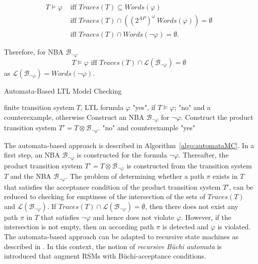 \documentclass[a4paper, 12pt, twoside]{report}
\begin{document}
	\begin{align*}
		T \models \varphi & \text{ iff } Traces(T) \subseteq Words(\varphi)\\
		& \text{ iff } Traces(T) \cap ((2^{AP})^{\omega} \ Words(\varphi)) = \emptyset\\
		& \text{ iff } Traces(T) \cap Words(\neg \varphi) = \emptyset.	
	\end{align*}
	
	Therefore, for NBA $\mathcal{B}_{\neg \varphi}$
	\[T \models \varphi \text{ iff } Traces(T) \cap \mathcal{L}(\mathcal{B}_{\neg \varphi}) = \emptyset\] as $\mathcal{L}(\mathcal{B}_{\neg \varphi}) = Words(\neg \varphi)$.

	\begin{algorithm}
		\caption{Automata-Based LTL Model Checking}\label{algo:automataMC}
		\begin{algorithmic} 
			\REQUIRE finite transition system $T$, LTL formula $\varphi$
			\ENSURE "yes", if $T \models \varphi$; "no" and a counterexample, otherwise 
			\STATE Construct an NBA $\mathcal{B}_{\neg \varphi}$ for $\neg \varphi$.
			\STATE Construct the product transition system $T'=T \otimes \mathcal{B}_{\neg \varphi}$.
			\RETURN "no" and counterexample
			\ELSE
			\RETURN "yes"
			\ENDIF
		\end{algorithmic}
	\end{algorithm}

	The automata-based approach is described in Algorithm~\ref{algo:automataMC}. In a first step, an NBA $\mathcal{B}_{\neg \varphi}$ is constructed for the formula $\neg \varphi$. Thereafter, the product transition system $T'=T \otimes \mathcal{B}_{\neg \varphi}$ is constructed from the transition system $T$ and the NBA $\mathcal{B}_{\neg \varphi}$. The problem of determining whether a path $\pi$ exists in $T$ that satisfies the acceptance condition of the product transition system $T'$, can be reduced to checking for  emptiness of the intersection of the sets of $Traces(T)$ and $\mathcal{L}(\mathcal{B}_{\neg \varphi})$. If $Traces(T) \cap \mathcal{L}(\mathcal{B}_{\neg \varphi}) = \emptyset$, then there does not exist any path $\pi$ in $T$ that satisfies $\neg \varphi$ and hence does not violate $\varphi$. However, if the intersection is not empty, then an according path $\pi$ is detected and $\varphi$ is violated.\\
	
	The automata-based approach can be adapted to recursive state machines as described in \cite{alur2001analysis}. In this context, the notion of \textit{recursive Büchi automata} is introduced that augment RSMs with Büchi-acceptance conditions.\\ %
	
\end{document}

